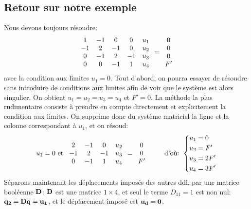    \subsection{Retour sur notre exemple}
\fi
Nous devons toujours résoudre:
\begin{equation}
\mathbf{\begin{array}{cccc} 1 & -1 & 0 & 0 \\ -1 & 2 & -1 & 0 \\ 0 & -1 & 2 & -1\\ 0&0&-1&1
\end{array}}
\mathbf{\begin{array}{c} u_1\\u_2\\u_3\\u_4 \end{array}}
=
\mathbf{\begin{array}{c} 0\\0\\0\\F' \end{array}}
\end{equation}
avec la condition aux limites $u_1=0$.
\medskipvm
Tout d'abord, on pourra essayer de résoudre sans introduire de conditions aux limites afin de voir que le système est alors singulier. On obtient $u_1=u_2=u_3=u_4$ et $F'=0$.
\medskipvm
La méthode la plus rudimentaire consiste à prendre en compte directement et explicitement la condition aux limites.
On supprime donc du système matriciel la ligne et la colonne correspondant à $u_1$, et on résoud:
\begin{equation}\label{Eq-Base}
u_1=0 \text{ et }
\mathbf{\begin{array}{ccc} 2 & -1 & 0 \\ -1 & 2 & -1\\ 0&-1&1 \end{array}}
\mathbf{\begin{array}{c} u_2\\u_3\\u_4 \end{array}}
=
\mathbf{\begin{array}{c} 0\\0\\F' \end{array}}
\qquad \text{ d'où: } 
\left\{\begin{aligned} &u_1=0 \\ &u_2=F' \\ &u_3=2F' \\ &u_4=3F' \end{aligned}\right.
\end{equation}
\medskipvm
Séparons maintenant les déplacements imposés des autres ddl, par une matrice booléenne $\mathbf{D}$:
$\mathbf{D}$ est une matrice $1\times 4$, et seul le terme $D_{11}=1$ est non nul: $\mathbf{q_2}=\mathbf{D}\mathbf{q}=\mathbf{u_1}$,
et le déplacement imposé est $\mathbf{u_d}=\mathbf{0}$.

